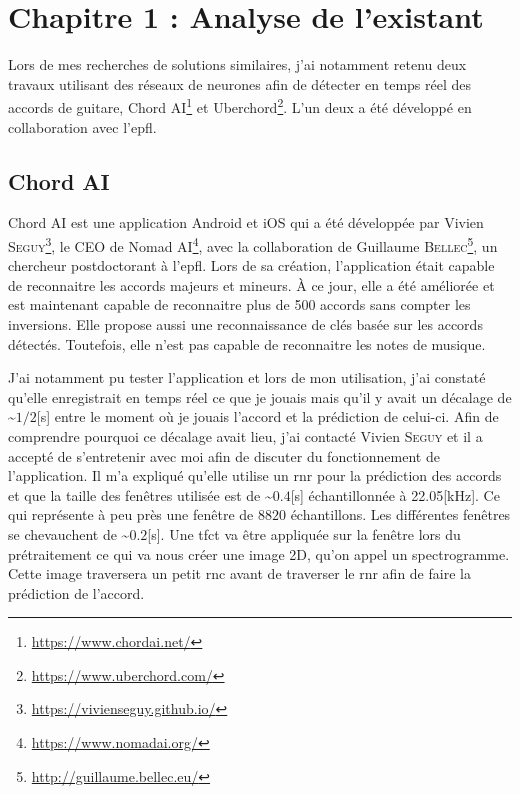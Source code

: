 \chapter{Chapitre 1 : Analyse de l'existant}
\label{chap:1}

Lors de mes recherches de solutions similaires, j'ai notamment retenu deux travaux utilisant des réseaux de neurones afin de détecter en temps réel des accords de guitare, Chord AI\footnote{\url{https://www.chordai.net/}} et Uberchord\footnote{\url{https://www.uberchord.com/}}. L'un deux a été développé en collaboration avec l'\gls{epfl}.

\section{Chord AI}
\label{sec:1.1}

Chord AI est une application Android et iOS qui a été développée par Vivien \textsc{Seguy}\footnote{\url{https://vivienseguy.github.io/}}, le CEO de Nomad AI\footnote{\url{https://www.nomadai.org/}}, avec la collaboration de Guillaume \textsc{Bellec}\footnote{\url{http://guillaume.bellec.eu/}}, un chercheur postdoctorant à l'\gls{epfl}. Lors de sa création, l'application était capable de reconnaitre les accords majeurs et mineurs. À ce jour, elle a été améliorée et est maintenant capable de reconnaitre plus de 500 accords sans compter les inversions. Elle propose aussi une reconnaissance de clés basée sur les accords détectés. Toutefois, elle n'est pas capable de reconnaitre les notes de musique.

J'ai notamment pu tester l'application et lors de mon utilisation, j'ai constaté qu'elle enregistrait en temps réel ce que je jouais mais qu'il y avait un décalage de \textasciitilde$1/2$[s] entre le moment où je jouais l'accord et la prédiction de celui-ci. Afin de comprendre pourquoi ce décalage avait lieu, j'ai contacté Vivien \textsc{Seguy} et il a accepté de s'entretenir avec moi afin de discuter du fonctionnement de l'application. Il m'a expliqué qu'elle utilise un \gls{rnr} pour la prédiction des accords et que la taille des fenêtres utilisée est de \textasciitilde$0.4$[s] échantillonnée à 22.05[kHz]. Ce qui représente à peu près une fenêtre de $8820$ échantillons. Les différentes fenêtres se chevauchent de \textasciitilde$0.2$[s]. Une \gls{tfct} va être appliquée sur la fenêtre lors du prétraitement ce qui va nous créer une image 2D, qu'on appel un spectrogramme. Cette image traversera un petit \gls{rnc} avant de traverser le \gls{rnr} afin de faire la prédiction de l'accord.

